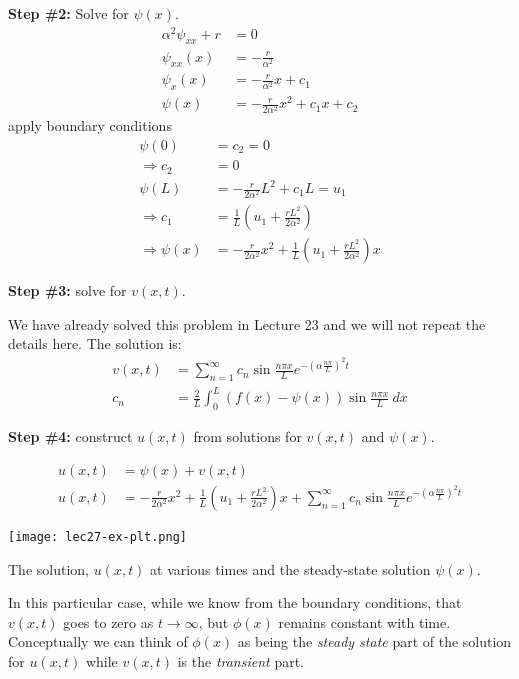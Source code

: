 \noindent\textbf{Step \#2:}  Solve for $\psi(x)$.
\begin{align*}
\alpha^2\psi_{xx}+r &= 0 \\
\psi_{xx}(x) &= -\frac{r}{\alpha^2} \\
\psi_{x}(x) &= -\frac{r}{\alpha^2}x + c_1 \\
\psi(x) &= -\frac{r}{2\alpha^2}x^2+c_1x + c_2
\end{align*}
apply boundary conditions
\begin{align*}
\psi(0) &= c_2 = 0 \\
\Rightarrow c_2 &= 0 \\
\psi(L) &= -\frac{r}{2\alpha^2}L^2 + c_1 L = u_1 \\
\Rightarrow c_1 &= \frac{1}{L}\left(u_1+\frac{rL^2}{2 \alpha^2}\right) \\
\Rightarrow \psi(x) &= -\frac{r}{2\alpha^2}x^2 + \frac{1}{L}\left(u_1+\frac{rL^2}{2 \alpha^2}\right)x
\end{align*}

\vspace{0.25cm}

\noindent\textbf{Step \#3:} solve for $v(x,t)$.

\vspace{0.25cm}

\noindent We have already solved this problem in Lecture 23 and we will not repeat the details here.  The solution is:
\begin{align*}
v(x,t) &= \sum\limits_{n=1}^{\infty} c_n \sin{\frac{n \pi x}{L}}e^{-\left(\alpha \frac{n \pi}{L}\right)^2 t} \\
c_n &= \frac{2}{L} \int_0^L \left(f(x)-\psi(x)\right)\sin{\frac{n \pi x}{L}} \ dx
\end{align*}

\vspace{0.25cm}

\noindent\textbf{Step \#4:} construct $u(x,t)$ from solutions for $v(x,t)$ and $\psi(x)$.

\begin{align*}
u(x,t) &= \psi(x) + v(x,t) \\
u(x,t) &= -\frac{r}{2\alpha^2}x^2 + \frac{1}{L}\left(u_1+\frac{rL^2}{2 \alpha^2}\right)x + \sum\limits_{n=1}^{\infty} c_n \sin{\frac{n \pi x}{L}}e^{-\left(\alpha \frac{n \pi}{L}\right)^2 t}
\end{align*}
\begin{marginfigure}
\texttt{[image: lec27-ex-plt.png]}
\caption{The solution, $u(x,t)$ at various times and the steady-state solution $\psi(x)$.}
\label{fig:lec27-ex-plt}
\end{marginfigure}
In this particular case, while we know from the boundary conditions, that $v(x,t)$ goes to zero as $t \rightarrow \infty$, but $\phi(x)$ remains constant with time.  Conceptually we can think of $\phi(x)$ as being the \emph{steady state} part of the solution for $u(x,t)$ while $v(x,t)$ is the \emph{transient} part.

